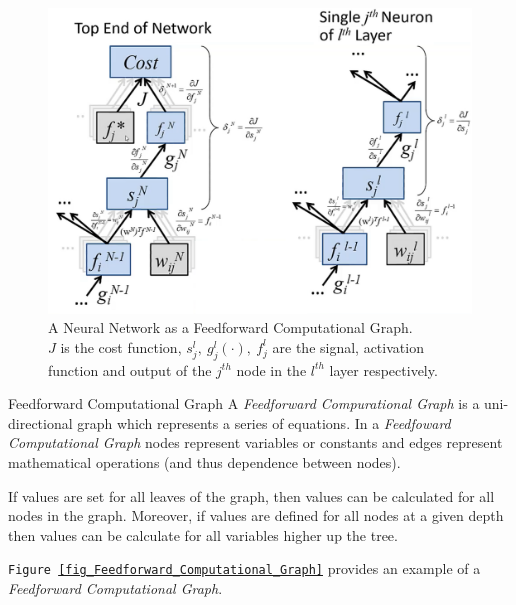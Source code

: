 \documentclass[11pt,a4paper]{article}
\begin{document}
  \begin{figure}[H]
    \begin{center}
      \includegraphics[width=.7\textwidth]{NeuralNetworkComputationalGraph.PNG}
    \end{center}
    \caption{A Neural Network as a Feedforward Computational Graph.\\ \footnotesize{$J$ is the cost function, $s_j^l,\ g_j^l(\cdot),\ f_j^l$ are the signal, activation function and output of the $j^{th}$ node in the $l^{th}$ layer respectively.} }
    \label{fig_NN_Feedforward_Computational_Graph}
  \end{figure}

  \begin{definition}{Feedforward Computational Graph}
    A \textit{Feedforward Compurational Graph} is a uni-directional graph which represents a series of equations. In a \textit{Feedfoward Computational Graph} nodes represent variables or constants and edges represent mathematical operations (and thus dependence between nodes).
    \par If values are set for all leaves of the graph, then values can be calculated for all nodes in the graph. Moreover, if values are defined for all nodes at a given depth then values can be calculate for all variables higher up the tree.
    \par \texttt{Figure \ref{fig_Feedforward_Computational_Graph}} provides an example of a \textit{Feedforward Computational Graph}.
  \end{definition}
\end{document}
